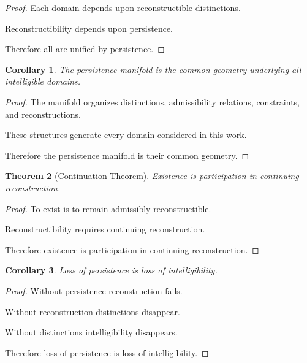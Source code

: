 \documentclass[12pt,oneside]{article}
\newtheorem{theorem}{Theorem}[section] \newtheorem{lemma}[theorem]{Lemma} \newtheorem{proposition}[theorem]{Proposition} \newtheorem{corollary}[theorem]{Corollary}
\theoremstyle{definition}
\begin{document}
\begin{proof}

Each domain depends upon reconstructible distinctions.

Reconstructibility depends upon persistence.

Therefore all are unified by persistence.

\end{proof}

\begin{corollary}

The persistence manifold is the common geometry underlying all intelligible domains.

\end{corollary}

\begin{proof}

The manifold organizes distinctions, admissibility relations, constraints, and reconstructions.

These structures generate every domain considered in this work.

Therefore the persistence manifold is their common geometry.

\end{proof}

\begin{theorem}[Continuation Theorem]

Existence is participation in continuing reconstruction.

\end{theorem}

\begin{proof}

To exist is to remain admissibly reconstructible.

Reconstructibility requires continuing reconstruction.

Therefore existence is participation in continuing reconstruction.

\end{proof}

\begin{corollary}

Loss of persistence is loss of intelligibility.

\end{corollary}

\begin{proof}

Without persistence reconstruction fails.

Without reconstruction distinctions disappear.

Without distinctions intelligibility disappears.

Therefore loss of persistence is loss of intelligibility.

\end{proof}
\end{document}

